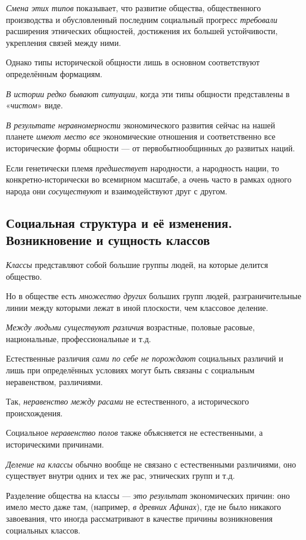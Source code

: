 \documentclass[a4paper,14pt,russian]{extreport}
\begin{document}
\emph{Смена этих типов} показывает, что развитие общества, общественного производства и обусловленный последним социальный прогресс \emph{требовали} расширения этнических общностей, достижения их большей устойчивости, укрепления связей между ними.

Однако типы исторической общности лишь в основном соответствуют определённым формациям.

\emph{\textsc{В} истории редко бывают ситуации}, когда эти типы общности представлены в «\emph{чистом}» виде.

\emph{В результате неравномерности} экономического развития сейчас на нашей планете \emph{имеют место все} экономические отношения и соответственно все исторические формы общности --- от первобытнообщинных до развитых наций.

Если генетически племя \emph{предшествует} народности, а народность нации, то конкретно-исторически во всемирном масштабе, а очень часто в рамках одного народа они \emph{сосуществуют} и взаимодействуют друг с другом.

\subsection{Социальная структура и её изменения. Возникновение и сущность классов}

\emph{Классы} представляют собой большие группы людей, на которые делится общество.

Но в обществе есть \emph{множество других} больших групп людей, разграничительные линии между которыми лежат в иной плоскости, чем классовое деление.

\emph{Между людьми существуют различия} возрастные, половые расовые, национальные, профессиональные и т.д.

Естественные различия \emph{сами по себе не порождают} социальных различий и лишь при определённых условиях могут быть связаны с социальным неравенством, различиями.

Так, \emph{неравенство между расами} не естественного, а исторического происхождения.

Социальное \emph{неравенство полов} также объясняется не естественными, а историческими причинами.

\emph{Деление на классы} обычно вообще не связано с естественными различиями, оно существует внутри одних и тех же рас, этнических групп и т.д.

Разделение общества на классы --- \emph{это результат} экономических причин: оно имело место даже там, (например, \emph{в древних Афинах}), где не было никакого завоевания, что иногда рассматривают в качестве причины возникновения социальных классов.
\end{document}
